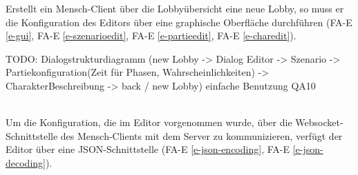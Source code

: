Erstellt ein Mensch-Client über die Lobbyübersicht eine neue Lobby, so muss er die Konfiguration des Editors über eine graphische Oberfläche durchführen (FA-E \ref{e-gui}, FA-E \ref{e-szenarioedit}, FA-E \ref{e-partieedit}, FA-E \ref{e-charedit}).

TODO: Dialogstrukturdiagramm (new Lobby -> Dialog Editor -> Szenario -> Partiekonfiguration(Zeit für Phasen, Wahrscheinlichkeiten) -> CharakterBeschreibung -> back / new Lobby) einfache Benutzung QA10

\mbox{}\\
Um die Konfiguration, die im Editor vorgenommen wurde, über die Websocket-Schnittstelle des Mensch-Clients mit dem Server zu kommunizieren, verfügt der Editor über eine JSON-Schnittstelle (FA-E \ref{e-json-encoding}, FA-E \ref{e-json-decoding}).